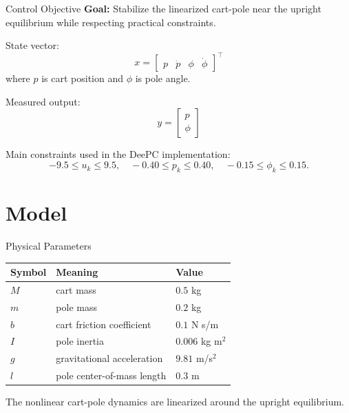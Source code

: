 \documentclass[aspectratio=169,11pt]{beamer}
\begin{document}
\begin{frame}{Control Objective}
    \textbf{Goal:} Stabilize the linearized cart-pole near the upright equilibrium while respecting practical constraints.

    \vspace{0.4cm}
    State vector:
    \[
    x =
    \begin{bmatrix}
    p & \dot{p} & \phi & \dot{\phi}
    \end{bmatrix}^{\top}
    \]
    where $p$ is cart position and $\phi$ is pole angle.

    \vspace{0.3cm}
    Measured output:
    \[
    y =
    \begin{bmatrix}
    p \\ \phi
    \end{bmatrix}
    \]

    \vspace{0.3cm}
    Main constraints used in the DeePC implementation:
    \[
    -9.5 \leq u_k \leq 9.5,\quad
    -0.40 \leq p_k \leq 0.40,\quad
    -0.15 \leq \phi_k \leq 0.15.
    \]
\end{frame}

\section{Model}

\begin{frame}{Physical Parameters}
    \begin{table}
        \centering
        \begin{tabular}{lll}
            \toprule
            Symbol & Meaning & Value \\
            \midrule
            $M$ & cart mass & $0.5$ kg \\
            $m$ & pole mass & $0.2$ kg \\
            $b$ & cart friction coefficient & $0.1$ N s/m \\
            $I$ & pole inertia & $0.006$ kg m$^2$ \\
            $g$ & gravitational acceleration & $9.81$ m/s$^2$ \\
            $l$ & pole center-of-mass length & $0.3$ m \\
            \bottomrule
        \end{tabular}
    \end{table}

    \vspace{0.2cm}
    The nonlinear cart-pole dynamics are linearized around the upright equilibrium.
\end{frame}
\end{document}
